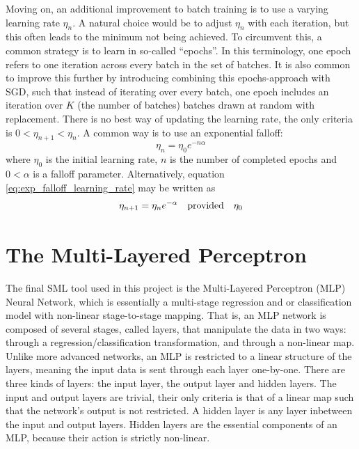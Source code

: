 \documentclass[nofootinbib,reprint,english]{revtex4-1}
\begin{document}
Moving on, an additional improvement to batch training is to use a varying learning rate \(\eta_n\). A natural choice would be to adjust \(\eta_n\) with each iteration, but this often leads to the minimum not being achieved. To circumvent this, a common strategy is to learn in so-called ``epochs''. In this terminology, one epoch refers to one iteration across every batch in the set of batches. It is also common to improve this further by introducing combining this epochs-approach with SGD, such that instead of iterating over every batch, one epoch includes an iteration over \(K\) (the number of batches) batches drawn at random with replacement. There is no best way of updating the learning rate, the only criteria is \(0<\eta_{n+1}<\eta_n\). A common way is to use an exponential falloff:
\begin{equation}\label{eq:exp_falloff_learning_rate}
\eta_n=\eta_0 e^{-n\alpha}
\end{equation}
where \(\eta_0\) is the initial learning rate, \(n\) is the number of completed epochs and \(0<\alpha\) is a falloff parameter. Alternatively, equation \eqref{eq:exp_falloff_learning_rate} may be written as
\begin{equation}
\eta_{n+1}=\eta_n e^{-\alpha}\qq{provided}\eta_0
\end{equation}
\section{The Multi-Layered Perceptron}
The final SML tool used in this project is the Multi-Layered Perceptron (MLP) Neural Network, which is essentially a multi-stage regression and or classification model with non-linear stage-to-stage mapping. That is, an MLP network is composed of several stages, called layers, that manipulate the data in two ways: through a regression/classification transformation, and through a non-linear map. Unlike more advanced networks, an MLP is restricted to a linear structure of the layers, meaning the input data is sent through each layer one-by-one. There are three kinds of layers: the input layer, the output layer and hidden layers. The input and output layers are trivial, their only criteria is that of a linear map such that the network's output is not restricted. A hidden layer is any layer inbetween the input and output layers. Hidden layers are  the essential components of an MLP, because their action is strictly non-linear.
\end{document}
